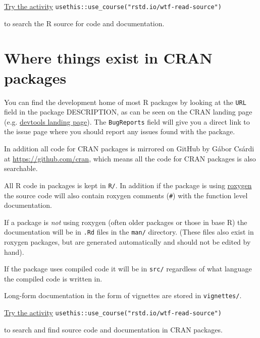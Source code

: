 \documentclass[
  letterpaper,
]{book}
\begin{document}
\begin{rmdinfo}
\href{https://raw.githubusercontent.com/jimhester/wtf-read-source/master/01_read-source_spartan.R}{Try
the activity} \texttt{usethis::use\_course("rstd.io/wtf-read-source")}

to search the R source for code and documentation.
\end{rmdinfo}

\hypertarget{where-things-exist-in-cran-packages}{%
\section{Where things exist in CRAN
packages}\label{where-things-exist-in-cran-packages}}

You can find the development home of most R packages by looking at the
\texttt{URL} field in the package DESCRIPTION, as can be seen on the
CRAN landing page (e.g.
\href{https://cran.r-project.org/package=devtools}{devtools landing
page}). The \texttt{BugReports} field will give you a direct link to the
issue page where you should report any issues found with the package.

In addition all code for CRAN packages is mirrored on GitHub by Gábor
Csárdi at \url{https://github.com/cran}, which means all the code for
CRAN packages is also searchable.

All R code in packages is kept in \texttt{R/}. In addition if the
package is using \href{http://klutometis.github.io/roxygen/}{roxygen}
the source code will also contain roxygen comments
(\texttt{\#\textquotesingle{}}) with the function level documentation.

If a package is \emph{not} using roxygen (often older packages or those
in base R) the documentation will be in \texttt{.Rd} files in the
\texttt{man/} directory. (These files also exist in roxygen packages,
but are generated automatically and should not be edited by hand).

If the package uses compiled code it will be in \texttt{src/} regardless
of what language the compiled code is written in.

Long-form documentation in the form of vignettes are stored in
\texttt{vignettes/}.

\begin{rmdinfo}
\href{https://raw.githubusercontent.com/jimhester/wtf-read-source/master/02_read-source_spartan.R}{Try
the activity} \texttt{usethis::use\_course("rstd.io/wtf-read-source")}

to search and find source code and documentation in CRAN packages.
\end{rmdinfo}
\end{document}
